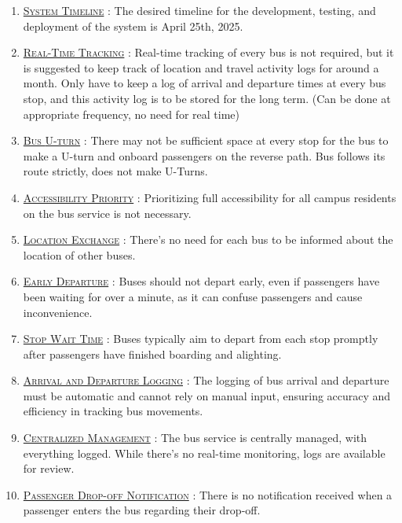 \begin{enumerate}
    \item \underline{\textsc{System Timeline}} : The desired timeline for the development, testing, and deployment of the system is April 25th, 2025.

    \item {}\underline{\textsc{Real-Time Tracking}} : Real-time tracking of every bus is not required, but it is suggested to keep track of location and travel activity logs for around a month. Only have to keep a log of arrival and departure times at every bus stop, and this activity log is to be stored for the long term. (Can be done at appropriate frequency, no need for real time)

    \item {}\underline{\textsc{Bus \gls{U-turn}}} : There may not be sufficient space at every stop for the bus to make a \gls{U-turn} and onboard passengers on the reverse path. Bus follows its route strictly, does not make U-Turns.

    \item {}\underline{\textsc{Accessibility Priority}} : Prioritizing full accessibility for all campus residents on the bus service is not necessary.

    \item \underline{\textsc{Location Exchange}} : There's no need for each bus to be informed about the location of other buses.

    \item \underline{\textsc{Early Departure}} : Buses should not depart early, even if passengers have been waiting for over a minute, as it can confuse passengers and cause inconvenience.

    \item \underline{\textsc{Stop Wait Time}} : Buses typically aim to depart from each stop promptly after passengers have finished boarding and alighting.

    \item \underline{\textsc{Arrival and Departure Logging}} : The logging of bus arrival and departure must be automatic and cannot rely on manual input, ensuring accuracy and efficiency in tracking bus movements.

    \item \underline{\textsc{Centralized Management}} : The bus service is centrally managed, with everything logged. While there's no real-time monitoring, logs are available for review.

    \item \underline{\textsc{Passenger Drop-off Notification}} : There is no notification received when a passenger enters the bus regarding their drop-off.


\end{enumerate}
